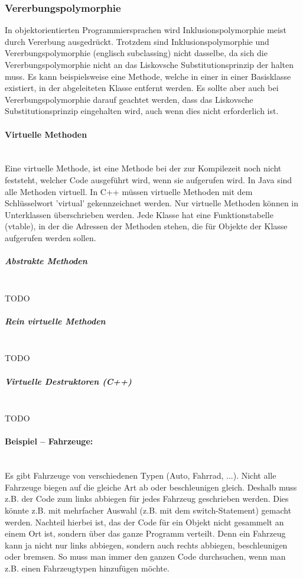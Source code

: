 		\subsubsection{Vererbungspolymorphie}
			In objektorientierten Programmiersprachen wird Inklusionspolymorphie meist durch Vererbung ausgedrückt.
			Trotzdem sind Inklusionspolymorphie und Vererbungspolymorphie (englisch subclassing) nicht dasselbe, da sich
			die Vererbungspolymorphie nicht an das Liskovsche Substitutionsprinzip der halten muss. Es kann beispielsweise
			eine Methode, welche in einer in einer Basisklasse existiert, in der abgeleiteten Klasse entfernt werden. Es
			sollte aber auch bei Vererbungspolymorphie darauf geachtet werden, dass das Liskovsche Substitutionsprinzip
			eingehalten wird, auch wenn dies nicht erforderlich ist.
			
			\paragraph{Virtuelle Methoden}\mbox{}\\
				Eine virtuelle Methode, ist eine Methode bei der zur Kompilezeit noch nicht feststeht, welcher Code ausgeführt
				wird, wenn sie aufgerufen wird. In Java sind alle Methoden virtuell. In C++ müssen virtuelle Methoden mit dem
				Schlüsselwort 'virtual' gekennzeichnet werden. Nur virtuelle Methoden können in Unterklassen überschrieben
				werden. Jede Klasse hat eine Funktionstabelle (vtable), in der die Adressen der Methoden stehen, die für Objekte der
				Klasse aufgerufen werden sollen.
				
				\subparagraph{Abstrakte Methoden}\mbox{}\\
					TODO
				
				\subparagraph{Rein virtuelle Methoden}\mbox{}\\
					TODO
					
				\subparagraph{Virtuelle Destruktoren (C++)}\mbox{}\\
					TODO
			
			\paragraph*{Beispiel -- Fahrzeuge:}\mbox{}\\
				Es gibt Fahrzeuge von verschiedenen Typen (Auto, Fahrrad, ...). Nicht alle Fahrzeuge biegen auf die gleiche Art
				ab oder beschleunigen gleich. Deshalb muss z.B. der Code zum links abbiegen für jedes Fahrzeug geschrieben
				werden. Dies könnte z.B. mit mehrfacher Auswahl (z.B. mit dem switch-Statement) gemacht werden.
				\UseRawInputEncoding{}
				Nachteil hierbei ist, das der Code für ein Objekt nicht gesammelt an einem Ort ist, sondern über das ganze Programm verteilt.
				Denn ein Fahrzeug kann ja nicht nur links abbiegen, sondern auch rechts abbiegen, beschleunigen oder bremsen. 
				So muss man immer den ganzen Code durchsuchen, wenn man z.B. einen Fahrzeugtypen hinzufügen möchte.
				
